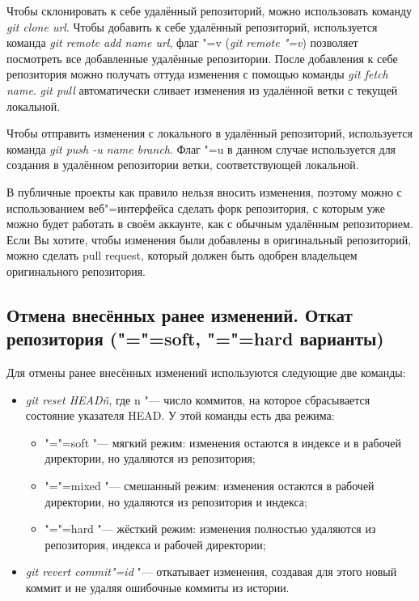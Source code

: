 \documentclass[12pt]{article}
\begin{document}
Чтобы склонировать к себе удалённый репозиторий, можно использовать команду \textit{git clone url}. Чтобы добавить к себе удалённый репозиторий, используется команда \textit{git remote add name url}, флаг "=v (\textit{git remote "=v}) позволяет посмотреть все добавленные удалённые репозитории. После добавления к себе репозитория можно получать оттуда изменения с помощью команды \textit{git fetch name}. \textit{git pull} автоматически сливает изменения из удалённой ветки с текущей локальной.

Чтобы отправить изменения с локального в удалённый репозиторий, используется команда \textit{git push -u name branch}. Флаг "=u в данном случае используется для создания в удалённом репозитории ветки, соответствующей локальной.

В публичные проекты как правило нельзя вносить изменения, поэтому можно с использованием веб"=интерфейса сделать форк репозитория, с которым уже можно будет работать в своём аккаунте, как с обычным удалённым репозиторием. Если Вы хотите, чтобы изменения были добавлены в оригинальный репозиторий, можно сделать pull request, который должен быть одобрен владельцем оригинального репозитория.

\subsection{Отмена внесённых ранее изменений. Откат репозитория ("="=soft, "="=hard варианты)}
Для отмены ранее внесённых изменений используются следующие две команды:
\begin{itemize}
\item \textit{git reset HEAD\~n}, где n "--- число коммитов, на которое сбрасывается состояние указателя HEAD. У этой команды есть два режима:
	\begin{itemize}
	\item "="=soft "--- мягкий режим: изменения остаются в индексе и в рабочей директории, но удаляются из репозитория;
	\item "="=mixed "--- смешанный режим: изменения остаются в рабочей директории, но удаляются из репозитория и индекса;
	\item "="=hard "--- жёсткий режим: изменения полностью удаляются из репозитория, индекса и рабочей директории;
	\end{itemize}
\item \textit{git revert commit"=id} "--- откатывает изменения, создавая для этого новый коммит и не удаляя ошибочные коммиты из истории.
\end{itemize}
\end{document}
